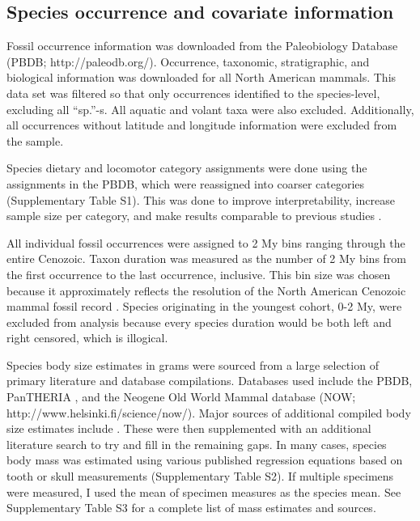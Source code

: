 \documentclass{pnastwo}
\begin{document}
\begin{article}
\begin{materials}
\section{Species occurrence and covariate information}
Fossil occurrence information was downloaded from the Paleobiology Database (PBDB; http://paleodb.org/). Occurrence, taxonomic, stratigraphic, and biological information was downloaded for all North American mammals. This data set was filtered so that only occurrences identified to the species-level, excluding all ``sp.''-s. All aquatic and volant taxa were also excluded. Additionally, all occurrences without latitude and longitude information were excluded from the sample.

Species dietary and locomotor category assignments were done using the assignments in the PBDB, which were reassigned into coarser categories (Supplementary Table S1). This was done to improve interpretability, increase sample size per category, and make results comparable to previous studies \cite{Jernvall2004,Price2012}.

All individual fossil occurrences were assigned to 2 My bins ranging through the entire Cenozoic. Taxon duration was measured as the number of 2 My bins from the first occurrence to the last occurrence, inclusive. This bin size was chosen because it approximately reflects the resolution of the North American Cenozoic mammal fossil record \cite{Alroy2009,Alroy2000g,Marcot2014}. Species originating in the youngest cohort, 0-2 My, were excluded from analysis because every species duration would be both left and right censored, which is illogical.

Species body size estimates in grams were sourced from a large selection of primary literature and database compilations. Databases used include the PBDB, PanTHERIA \cite{Jones2009c}, and the Neogene Old World Mammal database (NOW; http://www.helsinki.fi/science/now/). Major sources of additional compiled body size estimates include \cite{Tomiya2013,Brook2004a,Freudenthal2013,McKenna2011,Raia2012f,Smith2004c}. These were then supplemented with an additional literature search to try and fill in the remaining gaps. In many cases, species body mass was estimated using various published regression equations based on tooth or skull measurements (Supplementary Table S2). If multiple specimens were measured, I used the mean of specimen measures as the species mean. See Supplementary Table S3 for a complete list of mass estimates and sources.


\end{materials}
\end{article}
\end{document}
